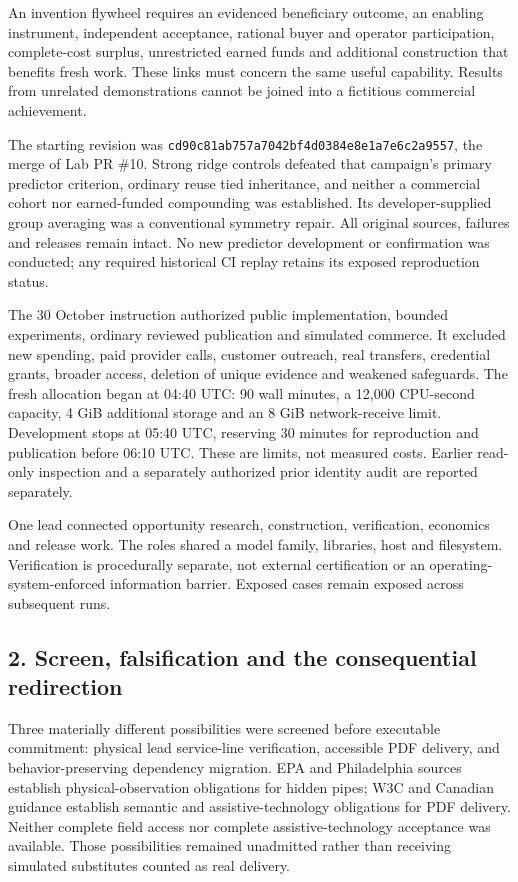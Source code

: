 \documentclass[
  10pt,
]{article}
\begin{document}
An invention flywheel requires an evidenced beneficiary outcome, an
enabling instrument, independent acceptance, rational buyer and operator
participation, complete-cost surplus, unrestricted earned funds and
additional construction that benefits fresh work. These links must
concern the same useful capability. Results from unrelated
demonstrations cannot be joined into a fictitious commercial
achievement.

The starting revision was
\nolinkurl{cd90c81ab757a7042bf4d0384e8e1a7e6c2a9557}, the merge of Lab PR
\#10. Strong ridge controls defeated that campaign's primary predictor
criterion, ordinary reuse tied inheritance, and neither a commercial
cohort nor earned-funded compounding was established. Its
developer-supplied group averaging was a conventional symmetry repair.
All original sources, failures and releases remain intact. No new
predictor development or confirmation was conducted; any required
historical CI replay retains its exposed reproduction status.

The 30 October instruction authorized public implementation, bounded
experiments, ordinary reviewed publication and simulated commerce. It
excluded new spending, paid provider calls, customer outreach, real
transfers, credential grants, broader access, deletion of unique
evidence and weakened safeguards. The fresh allocation began at 04:40
UTC: 90 wall minutes, a 12,000 CPU-second capacity, 4 GiB additional
storage and an 8 GiB network-receive limit. Development stops at 05:40
UTC, reserving 30 minutes for reproduction and publication before 06:10
UTC. These are limits, not measured costs. Earlier read-only inspection
and a separately authorized prior identity audit are reported
separately.

One lead connected opportunity research, construction, verification,
economics and release work. The roles shared a model family, libraries,
host and filesystem. Verification is procedurally separate, not external
certification or an operating-system-enforced information barrier.
Exposed cases remain exposed across subsequent runs.

\hypertarget{screen-falsification-and-the-consequential-redirection}{%
\subsection{2. Screen, falsification and the consequential
redirection}\label{screen-falsification-and-the-consequential-redirection}}

Three materially different possibilities were screened before executable
commitment: physical lead service-line verification, accessible PDF
delivery, and behavior-preserving dependency migration. EPA and
Philadelphia sources establish physical-observation obligations for
hidden pipes; W3C and Canadian guidance establish semantic and
assistive-technology obligations for PDF delivery. Neither complete
field access nor complete assistive-technology acceptance was available.
Those possibilities remained unadmitted rather than receiving simulated
substitutes counted as real delivery.
\end{document}
